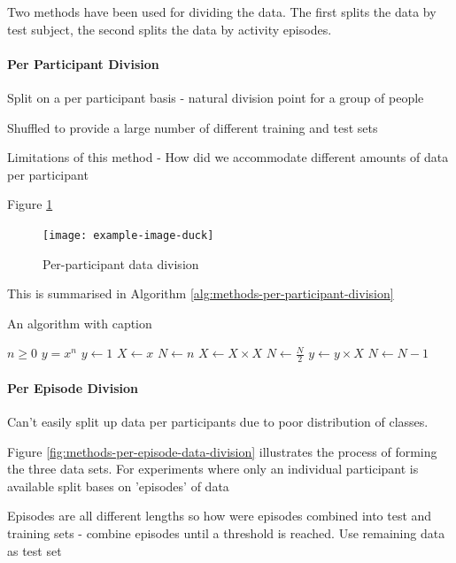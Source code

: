 Two methods have been used for dividing the data. The first splits the data by test subject, the second splits the data by activity episodes.

\paragraph{Per Participant Division}
\label{par:methods-per-participant-division}
Split on a per participant basis - natural division point for a group of people

Shuffled to provide a large number of different training and test sets

Limitations of this method
 - How did we accommodate different amounts of data per participant
 
Figure \ref{fig:methods-per-participant-division}
 
 \begin{figure}[!hbt]
     \centering
     \texttt{[image: example-image-duck]}
     \caption{Per-participant data division}
     \label{fig:methods-per-participant-division}
 \end{figure}
 
 This is summarised in Algorithm \ref{alg:methods-per-participant-division}
\begin{algorithm}
\caption{An algorithm with caption}
\label{alg:methods-per-participant-division}
\begin{algorithmic}
\Require $n \geq 0$
\Ensure $y = x^n$
\State $y \gets 1$
\State $X \gets x$
\State $N \gets n$
    \State $X \gets X \times X$
    \State $N \gets \frac{N}{2}$  
    \State $y \gets y \times X$
    \State $N \gets N - 1$
\EndIf
\EndWhile
\end{algorithmic}
\end{algorithm}

\paragraph{Per Episode Division}
\label{par:methods-per-episode-division}
Can't easily split up data per participants due to poor distribution of classes. 

Figure \ref{fig:methods-per-episode-data-division} illustrates the process of forming the three data sets.
For experiments where only an individual participant is available split bases on 'episodes' of data

Episodes are all different lengths so how were episodes combined into test and training sets
    - combine episodes until a threshold is reached. Use remaining data as test set

